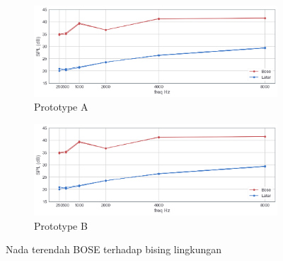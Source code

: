 \documentclass[12pt,]{article}
\begin{document}
\begin{itemize}
		\begin{figure}[!ht]
			\centering
			\begin{subfigure}[b]{0.5\textwidth}
				\includegraphics[width=\textwidth]{images/graph/boselowest_unit1}
				\caption{Prototype A}
			\end{subfigure}
			\begin{subfigure}[b]{0.5\textwidth}
				\includegraphics[width=\textwidth]{images/graph/boselowest_unit1}
				\caption{Prototype B}
			\end{subfigure}
			\caption{Nada terendah BOSE terhadap bising lingkungan}
		\end{figure}
	

\end{itemize}
\end{document}
